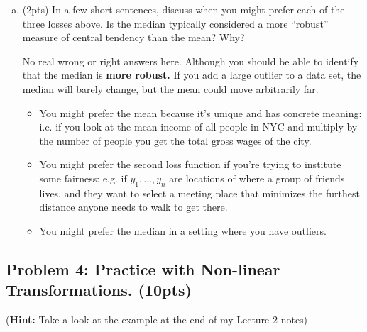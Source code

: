 \documentclass[10pt]{article}
\begin{document}
\begin{enumerate}[(a)]
	
	\item (2pts) In a few short sentences, discuss when you might prefer each of the three losses above. Is the median typically considered a more ``robust'' measure of central tendency than the mean? Why?
	
	No real wrong or right answers here. Although you should be able to identify that the median is \textbf{more robust.} If you add a large outlier to a data set, the median will barely change, but the mean could move arbitrarily far.
	\begin{itemize}
		\item You might prefer the mean because it's unique and has concrete meaning: i.e. if you look at the mean income of all people in NYC and multiply by the number of people you get the total gross wages of the city. 
		\item You might prefer the second loss function if you're trying to institute some fairness: e.g. if $y_1, \ldots, y_n$ are locations of where a group of friends lives, and they want to select a meeting place that minimizes the furthest distance anyone needs to walk to get there.
		\item You might prefer the median in a setting where you have outliers.
	\end{itemize}
\end{enumerate}

\newpage
\subsection{Problem 4: Practice with Non-linear Transformations. (10pts)}
(\textbf{Hint:} Take a look at the example at the end of my Lecture 2 notes)
\vspace{.5em}
\end{document}
